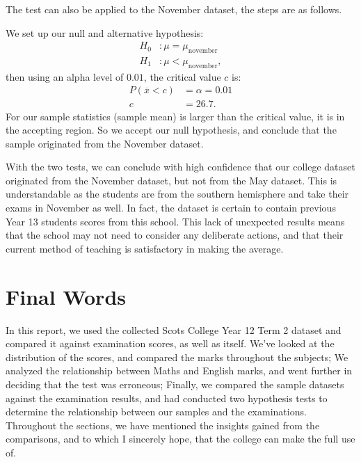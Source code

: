 \documentclass[a4paper,12pt]{tufte-handout}
\begin{document}
The test can also be applied to the November dataset, the steps are as follows.

We set up our null and alternative hypothesis:
\begin{align*}
    H_0 &: \mu = \mu_{\text{november}}\\
    H_1 &: \mu < \mu_{\text{november}},
\end{align*}
then using an alpha level of $0.01$, the critical value $c$ is:
\begin{align*}
   P(\overline{x} < c) &= \alpha = 0.01\\
   c &= 26.7.
\end{align*}
For our sample statistics (sample mean) is larger than the critical value, it is in the accepting region. So we accept our null hypothesis, and conclude that the sample originated from the November dataset.

With the two tests, we can conclude with high confidence that our college dataset originated from the November dataset, but not from the May dataset. This is understandable as the students are from the southern hemisphere and take their exams in November as well. In fact, the dataset is certain to contain previous Year 13 students scores from this school. This lack of unexpected results means that the school may not need to consider any deliberate actions, and that their current method of teaching is satisfactory in making the average.

\section{Final Words}
In this report, we used the collected Scots College Year 12 Term 2 dataset and compared it against examination scores, as well as itself. We've looked at the distribution of the scores, and compared the marks throughout the subjects; We analyzed the relationship between Maths and English marks, and went further in deciding that the test was erroneous; Finally, we compared the sample datasets against the examination results, and had conducted two hypothesis tests to determine the relationship between our samples and the examinations. Throughout the sections, we have mentioned the insights gained from the comparisons, and to which I sincerely hope, that the college can make the full use of.
\end{document}
